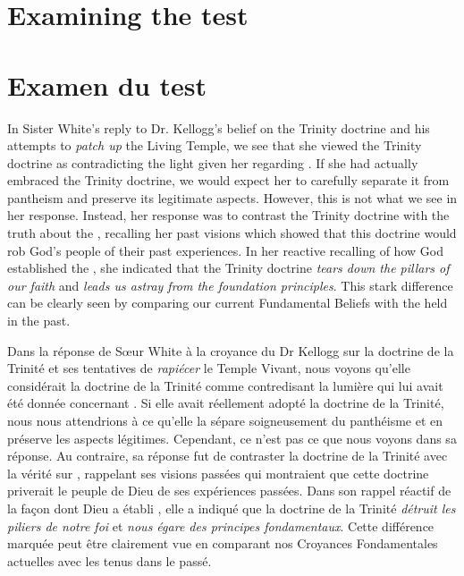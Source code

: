\chapter{Examining the test}


\chapter{Examen du test}


In Sister White's reply to Dr. Kellogg's belief on the Trinity doctrine and his attempts to \textit{patch up} the Living Temple, we see that she viewed the Trinity doctrine as contradicting the light given her regarding . If she had actually embraced the Trinity doctrine, we would expect her to carefully separate it from pantheism and preserve its legitimate aspects. However, this is not what we see in her response. Instead, her response was to contrast the Trinity doctrine with the truth about the , recalling her past visions which showed that this doctrine would rob God's people of their past experiences. In her reactive recalling of how God established the , she indicated that the Trinity doctrine \textit{tears down the pillars of our faith} and \textit{leads us astray from the foundation principles}. This stark difference can be clearly seen by comparing our current Fundamental Beliefs with the  held in the past.


Dans la réponse de Sœur White à la croyance du Dr Kellogg sur la doctrine de la Trinité et ses tentatives de \textit{rapiécer} le Temple Vivant, nous voyons qu'elle considérait la doctrine de la Trinité comme contredisant la lumière qui lui avait été donnée concernant . Si elle avait réellement adopté la doctrine de la Trinité, nous nous attendrions à ce qu'elle la sépare soigneusement du panthéisme et en préserve les aspects légitimes. Cependant, ce n'est pas ce que nous voyons dans sa réponse. Au contraire, sa réponse fut de contraster la doctrine de la Trinité avec la vérité sur , rappelant ses visions passées qui montraient que cette doctrine priverait le peuple de Dieu de ses expériences passées. Dans son rappel réactif de la façon dont Dieu a établi , elle a indiqué que la doctrine de la Trinité \textit{détruit les piliers de notre foi} et \textit{nous égare des principes fondamentaux}. Cette différence marquée peut être clairement vue en comparant nos Croyances Fondamentales actuelles avec les  tenus dans le passé.


